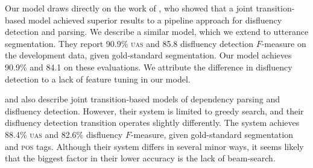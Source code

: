 \documentclass[11pt,letterpaper]{article}
\begin{document}
Our model draws directly on the work of \citet{honnibal:14}, who showed that
a joint transition-based model achieved superior results to a pipeline approach
for disfluency detection and parsing.  We describe a similar model, which we
extend to utterance segmentation.  They report 90.9\% \textsc{uas} and 85.8
disfluency detection $F$-measure on the development data, given gold-standard
segmentation.  Our model achieves 90.9\% and 84.1 on these evaluations.
We attribute the difference in disfluency detection to a lack of feature tuning
in our model.

\citet{rasooli:13} and \citet{rasooli:14} also describe joint transition-based
models of dependency parsing and disfluency detection.  However, their system
is limited to greedy search, and their disfluency detection transition operates
slightly differently.  The \citet{rasooli:14} system achieves 88.4\% \textsc{uas}
and 82.6\% disfluency $F$-measure, given gold-standard segmentation and \textsc{pos}
tags.  Although their system differs in several minor ways, it seems likely that
the biggest factor in their lower accuracy is the lack of beam-search.


\end{document}
